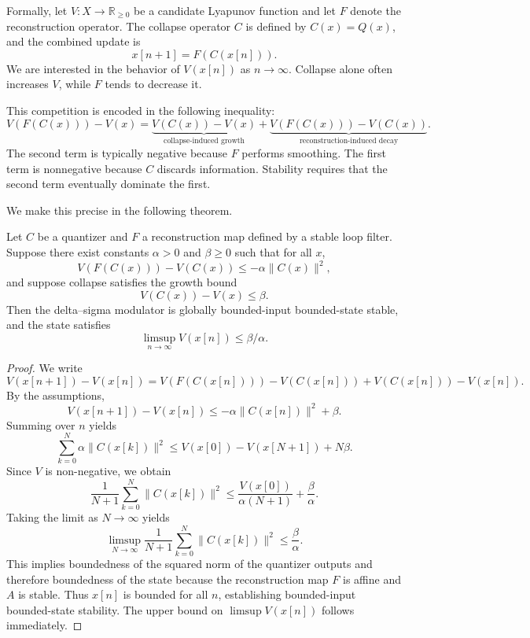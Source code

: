 Formally, let $V : X \to \mathbb{R}_{\geq 0}$ be a candidate Lyapunov function and let $F$ denote the reconstruction operator. The collapse operator $C$ is defined by $C(x) = Q(x)$, and the combined update is
\[
x[n+1] = F(C(x[n])).
\]
We are interested in the behavior of $V(x[n])$ as $n \to \infty$. Collapse alone often increases $V$, while $F$ tends to decrease it.

This competition is encoded in the following inequality:
\[
V(F(C(x))) - V(x) = \underbrace{V(C(x)) - V(x)}_{\text{collapse-induced growth}} + \underbrace{V(F(C(x))) - V(C(x))}_{\text{reconstruction-induced decay}}.
\]
The second term is typically negative because $F$ performs smoothing. The first term is nonnegative because $C$ discards information. Stability requires that the second term eventually dominate the first.

We make this precise in the following theorem.

\begin{theorem}
Let $C$ be a quantizer and $F$ a reconstruction map defined by a stable loop filter. Suppose there exist constants $\alpha > 0$ and $\beta \geq 0$ such that for all $x$,
\[
V(F(C(x))) - V(C(x)) \leq -\alpha \|C(x)\|^{2},
\]
and suppose collapse satisfies the growth bound
\[
V(C(x)) - V(x) \leq \beta.
\]
Then the delta--sigma modulator is globally bounded-input bounded-state stable, and the state satisfies
\[
\limsup_{n \to \infty} V(x[n]) \leq \beta / \alpha.
\]
\end{theorem}

\begin{proof}
We write
\[
V(x[n+1]) - V(x[n]) = V(F(C(x[n]))) - V(C(x[n])) + V(C(x[n])) - V(x[n]).
\]
By the assumptions,
\[
V(x[n+1]) - V(x[n]) \leq -\alpha \|C(x[n])\|^{2} + \beta.
\]
Summing over $n$ yields
\[
\sum_{k=0}^{N} \alpha \|C(x[k])\|^{2} \leq V(x[0]) - V(x[N+1]) + N \beta.
\]
Since $V$ is non-negative, we obtain
\[
\frac{1}{N+1} \sum_{k=0}^{N} \|C(x[k])\|^{2} \leq \frac{V(x[0])}{\alpha(N+1)} + \frac{\beta}{\alpha}.
\]
Taking the limit as $N \to \infty$ yields
\[
\limsup_{N \to \infty} \frac{1}{N+1} \sum_{k=0}^{N} \|C(x[k])\|^{2} \leq \frac{\beta}{\alpha}.
\]
This implies boundedness of the squared norm of the quantizer outputs and therefore boundedness of the state because the reconstruction map $F$ is affine and $A$ is stable. Thus $x[n]$ is bounded for all $n$, establishing bounded-input bounded-state stability. The upper bound on $\limsup V(x[n])$ follows immediately.
\end{proof}

